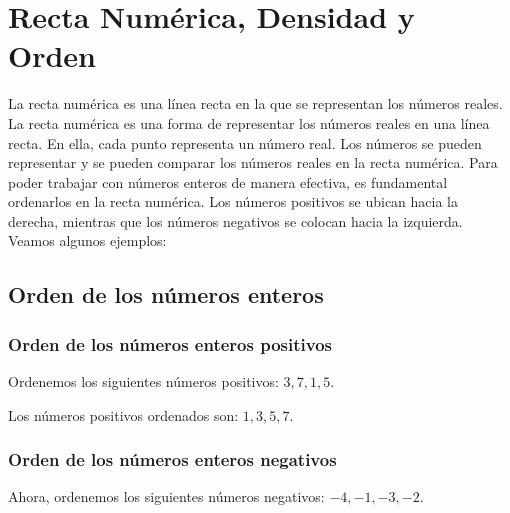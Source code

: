 \thispagestyle{plain}
\section{Recta Num\'erica, Densidad y Orden}

La recta numérica es una línea recta en la que se representan los números reales. La recta numérica es una forma de representar los números reales en una línea recta. En ella, cada punto representa un número real. Los números se pueden representar y se pueden comparar los números reales en la recta numérica.
Para poder trabajar con números enteros de manera efectiva, es fundamental ordenarlos en la recta numérica. Los números positivos se ubican hacia la derecha, mientras que los números negativos se colocan hacia la izquierda. Veamos algunos ejemplos:

\subsection{Orden de los números enteros}
\subsubsection{Orden de los números enteros positivos}
Ordenemos los siguientes números positivos: $3, 7, 1, 5$.


Los números positivos ordenados son: $1, 3, 5, 7$.

\subsubsection{Orden de los números enteros negativos}

Ahora, ordenemos los siguientes números negativos: $-4, -1, -3, -2$.

